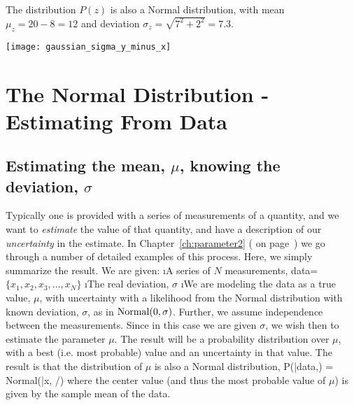 The distribution $P(z)$ is also a Normal distribution, with mean $\mu_{z}=20-8 = 12$ and deviation $\sigma_{z}=\sqrt{7^{2}+2^{2}}=7.3$.

\texttt{[image: gaussian\_sigma\_y\_minus\_x]}


\section{The Normal Distribution - Estimating From Data}

\subsection{Estimating the mean, $\mu$, knowing the deviation, $\sigma$}\label{sec:estmean}

Typically one is provided with a series of measurements of a quantity, and we want to \emph{estimate} the value of that quantity, and have a description of our \emph{uncertainty} in the estimate.  In Chapter~\ref{ch:parameter2} (\emph{} on page~\pageref{ch:parameter2}) we go through a number of detailed examples of this process.  Here, we simply summarize the result.  We are given:
\be
\i A series of $N$ measurements, data=$\{x_{1}, x_{2}, x_{3}, \ldots, x_{N}\}$ 
\i The real deviation, $\sigma$
\i We are modeling the data as a true value, $\mu$, with uncertainty with a likelihood from the Normal distribution with known deviation, $\sigma$, as in ${\rm Normal}(0,\sigma)$.  Further, we assume independence between the measurements.
\ee
 Since in this case we are given $\sigma$, we wish then to estimate the parameter $\mu$.  The result will be a probability distribution over $\mu$, with a best (i.e. most probable) value and an uncertainty in that value.  The result is that the distribution of $\mu$ is also a Normal distribution,
\beqn
P(\mu|{\rm data},\sigma) = {\rm Normal}(\bar{x}, \sigma/)
\eeqn where the center value (and thus the most probable value of $\mu$) is given by the sample mean of the data.


